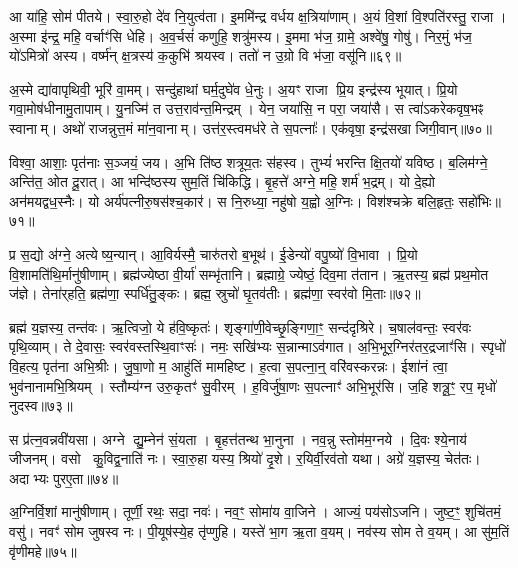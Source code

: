 आ या॑हि॒ सोम॑ पीतये।
स्वा॒रु॒हो दे॑व नि॒युत्व॑ता।
इ॒ममि॑न्द्र वर्धय क्ष॒त्रिया॑णाम्।
अ॒यं वि॒शां वि॒श्पति॑रस्तु॒ राजा।
अ॒स्मा इ॑न्द्र॒ महि॒ वर्चाꣳ॑सि धेहि।
अ॒व॒र्चसं॑ कणुहि॒ शत्रु॑मस्य।
इ॒ममा भ॑ज॒ ग्रामे॒ अश्वे॑षु॒ गोषु॑।
निर॒मुं भ॑ज॒ यो॑\-ऽमित्रो॑ अस्य।
वर्ष्म॑न् क्ष॒त्रस्य॑ क॒कुभि॑ श्रयस्व।
ततो॑ न उ॒ग्रो वि भ॑जा॒ वसू॑नि॥६९॥

अ॒स्मे द्या॑वापृथिवी॒ भूरि॑ वा॒मम्।
सन्दु॑हाथां घर्म॒दुघे॑व धे॒नुः।
अ॒यꣳ राजा प्रि॒य इन्द्र॑स्य भूयात्।
प्रि॒यो गवा॒मोष॑धीनामु॒तापाम्।
यु॒नज्मि॑ त उत्त॒राव॑न्त॒मिन्द्रम्।
येन॒ जया॑सि॒ न परा॒ जया॑सै।
स त्वा॑\-ऽकरेकवृष॒भꣴ स्वानाम्।
अथो॑ राजन्नुत्त॒मं मा॑न॒वानाम्।
उत्त॑र॒स्त्वमध॑रे ते स॒पत्नाः᳚।
एक॑वृषा॒ इन्द्र॑सखा जिगी॒वान्॥७०॥

विश्वा॒ आशाः॒ पृत॑नाः स॒ञ्जयं॒ जय\sn{}।
अ॒भि ति॑ष्ठ शत्रूय॒तः स॑हस्व।
तुभ्यं॑ भरन्ति क्षि॒तयो॑ यविष्ठ।
ब॒लिम॑ग्ने॒ अन्ति॑त॒ ओत दू॒रात्।
आ भन्दि॑ष्ठस्य सुम॒तिं चि॑किद्धि।
बृ॒हत्ते॑ अग्ने॒ महि॒ शर्म॑ भ॒द्रम्।
यो दे॒ह्यो अन॑मयद्वध॒स्नैः।
यो अर्य॑पत्नीरु॒षस॑श्च॒कार॑।
स नि॒रुध्या॒ नहु॑षो य॒ह्वो अ॒ग्निः।
विश॑श्चक्रे बलि॒हृतः॒ सहो॑भिः॥७१॥

प्र स॒द्यो अ॑ग्ने॒ अत्येष्य॒न्यान्।
आ॒विर्यस्मै॒ चारु॑तरो ब॒भूथ॑।
ई॒डेन्यो॑ वपु॒ष्यो॑ वि॒भावा।
प्रि॒यो वि॒शामति॑थि॒र्मानु॑षीणाम्।
ब्रह्म॑ज्येष्ठा वी॒र्या॑ सम्भृ॑तानि।
ब्रह्माग्रे॒ ज्येष्ठं॒ दिव॒मा त॑तान।
ऋ॒तस्य॒ ब्रह्म॑ प्रथ॒मोत ज॑ज्ञे।
तेना॑र्‌\mbox{}हति॒ ब्रह्म॑णा॒ स्पर्धि॑तु॒ङ्कः।
ब्रह्म॒ स्रुचो॑ घृ॒तव॑तीः।
ब्रह्म॑णा॒ स्वर॑वो मि॒ताः॥७२॥

ब्रह्म॑ य॒ज्ञस्य॒ तन्त॑वः।
ऋ॒त्विजो॒ ये ह॑वि॒ष्कृतः॑।
शृङ्गा॑णी॒वेच्छृ॒ङ्गिणा॒ꣳ॒ सन्द॑दृश्रिरे।
च॒षाल॑वन्तः॒ स्वर॑वः पृथि॒व्याम्।
ते दे॒वासः॒ स्वर॑वस्तस्थि॒वाꣳसः॑।
नमः॒ सखि॑भ्यः स॒न्नान्मा\-ऽव॑गात।
अ॒भि॒भूर॒ग्निर॑तर॒द्रजाꣳ॑सि।
स्पृधो॑ वि॒हत्य॒ पृत॑ना अभि॒श्रीः।
जु॒षा॒णो म॒ आहु॑तिं मामहिष्ट।
ह॒त्वा स॒पत्ना॒न्॒ वरि॑वस्करन्नः।
ईशा॑नं त्वा॒ भुव॑नानामभि॒श्रियम्।
स्तौम्य॑ग्न उरु॒कृतꣳ॑ सु॒वीरम्।
ह॒विर्जु॑षा॒णः स॒पत्नाꣳ॑ अभि॒भूर॑सि।
ज॒हि शत्रू॒ꣳ॒ रप॒ मृधो॑ नुदस्व॥७३॥\anuvakamend[वि॒शां ज॑यामसि जीरदानो॒ हर्या॒ विश्वा॒ दिवि॑ष्टिषु॒ वसू॑नि जिगी॒वान्थ्सहो॑भिर्मि॒ता न॑श्च॒त्वारि॑ च]

स प्र॑त्न॒वन्नवी॑यसा।
अग्ने द्यु॒म्नेन॑ सं॒यता।
बृ॒हत्त॑तन्थ भा॒नुना।
नव॒न्नु स्तोम॑म॒ग्नये।
दि॒वः श्ये॒नाय॑ जीजनम्।
वसो कु॒विद्व॒नाति॑ नः।
स्वा॒रु॒हा यस्य॒ श्रियो॑ दृ॒शे।
र॒यिर्वी॒रव॑तो यथा।
अग्रे॑ य॒ज्ञस्य॒ चेत॑तः।
अदाभ्यः पुरए॒ता॥७४॥

अ॒ग्निर्वि॒शां मानु॑षीणाम्।
तूर्णी॒ रथः॒ सदा॒ नवः॑।
नव॒ꣳ॒ सोमा॑य वा॒जिने।
आज्यं॒ पय॑सोऽजनि।
जुष्ट॒ꣳ॒ शुचि॑तमं॒ वसु॑।
नवꣳ॑ सोम जुषस्व नः।
पी॒यूष॑स्ये॒ह तृ॑प्णुहि।
यस्ते॑ भा॒ग ऋ॒ता व॒यम्।
नव॑स्य सोम ते व॒यम्।
आ सु॑म॒तिं वृ॑णीमहे॥७५॥

